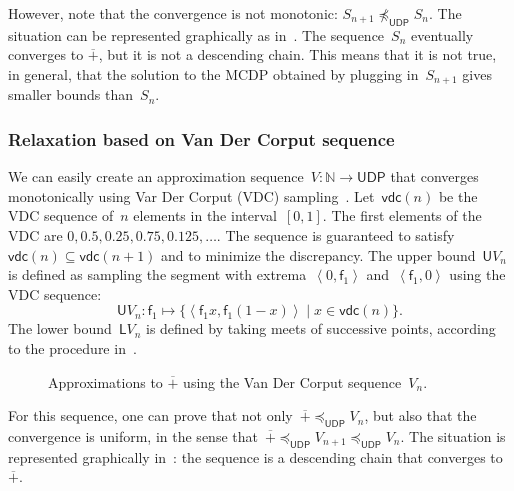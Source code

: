 \documentclass[twocolumn,english]{IEEEconf}
\theoremstyle{plain}
\theoremstyle{definition}
\theoremstyle{definition}
\theoremstyle{plain}
\newcommand{\aword}[1]{\mathsf{#1}}
\newcommand{\vmath}[1]{\aword{#1}}
\newcommand{\posleq}{\preceq}
\newcommand{\fun}{\vmath{f}}
\newcommand{\udpL}{\boldsymbol{\mathsf{L}}}
\newcommand{\udpU}{\boldsymbol{\mathsf{U}}}
\newcommand{\udpsp}{\vmath{UDP}}
\newcommand{\udpleq}{\posleq_\udpsp}
\newcommand{\vdc}{\vmath{vdc}}
\begin{document}
However, note that the convergence is not monotonic: $S_{n+1}{\not\posleq}_{\udpsp}S_{n}.$
The situation can be represented graphically as in~.
The sequence~$S_{n}$ eventually converges to $\overline{+}$, but
it is not a descending chain. This means that it is not true, in general,
that the solution to the MCDP obtained by plugging in~$S_{n+1}$
gives smaller bounds than~$S_{n}$.

\subsubsection*{Relaxation based on Van Der Corput sequence}

We can easily create an approximation sequence~$V:\mathbb{N}\rightarrow\udpsp$
that converges monotonically using Var Der Corput (VDC) sampling~\cite[Section 5.2]{LaValle2006Planning}.
Let~$\vdc(n)$ be the VDC sequence of~$n$ elements in the interval~$[0,1]$.
The first elements of the VDC are $0,0.5,0.25,0.75,0.125,\dots$.
The sequence is guaranteed to satisfy~$\vdc(n)\subseteq\vdc(n+1)$
and to minimize the discrepancy. The upper bound~$\udpU V_{n}$
is defined as sampling the segment with extrema~$\left\langle 0,\fun_{1}\right\rangle $
and~$\left\langle \fun_{1},0\right\rangle $ using the VDC sequence:
\[
\udpU V_{n}\colon\fun_{1}\mapsto\{\left\langle \fun_{1}x,\fun_{1}(1-x)\right\rangle \mid x\in\vdc(n)\}.
\]
 The lower bound~$\udpL V_{n}$ is defined by taking meets of successive
points, according to the procedure in~.
\begin{center}
\begin{figure}[H]
\begin{centering}
\par\end{centering}
\caption{\label{fig:Vn}Approximations to $\overline{+}$ using the Van Der
Corput sequence~$V_{n}$.}
\end{figure}
\par\end{center}

For this sequence, one can prove that not only~$\overline{+}\udpleq V_{n}$,
but also that the convergence is uniform, in the sense that~$\overline{+}\udpleq V_{n+1}\udpleq V_{n}.$
The situation is represented graphically in~:
the sequence is a descending chain that converges to~$\overline{+}$.
\end{document}
